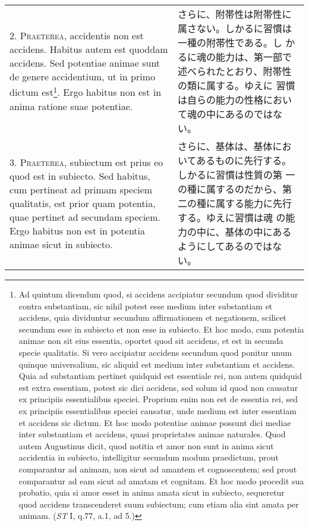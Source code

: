\documentclass[10pt]{jsarticle} %
\begin{document}
\begin{longtable}{p{21em}p{21em}}
2. {\scshape Praeterea}, accidentis non est accidens. Habitus autem
est quoddam accidens. Sed potentiae animae sunt de genere accidentium,
ut in primo dictum est\footnote{Ad quintum dicendum quod, si accidens
accipiatur secundum quod dividitur contra substantiam, sic nihil
potest esse medium inter substantiam et accidens, quia dividuntur
secundum affirmationem et negationem, scilicet secundum esse in
subiecto et non esse in subiecto. Et hoc modo, cum potentia animae non
sit eius essentia, oportet quod sit accidens, et est in secunda specie
qualitatis. Si vero accipiatur accidens secundum quod ponitur unum
quinque universalium, sic aliquid est medium inter substantiam et
accidens. Quia ad substantiam pertinet quidquid est essentiale rei,
non autem quidquid est extra essentiam, potest sic dici accidens, sed
solum id quod non causatur ex principiis essentialibus
speciei. Proprium enim non est de essentia rei, sed ex principiis
essentialibus speciei causatur, unde medium est inter essentiam et
accidens sic dictum. Et hoc modo potentiae animae possunt dici mediae
inter substantiam et accidens, quasi proprietates animae
naturales. Quod autem Augustinus dicit, quod notitia et amor non sunt
in anima sicut accidentia in subiecto, intelligitur secundum modum
praedictum, prout comparantur ad animam, non sicut ad amantem et
cognoscentem; sed prout comparantur ad eam sicut ad amatam et
cognitam. Et hoc modo procedit sua probatio, quia si amor esset in
anima amata sicut in subiecto, sequeretur quod accidens transcenderet
suum subiectum; cum etiam alia sint amata per animam. ({\itshape ST} I, q.77, a.1, ad 5.)}. Ergo habitus
non est in anima ratione suae potentiae.

&

さらに、附帯性は附帯性に属さない。しかるに習慣は一種の附帯性である。し
かるに魂の能力は、第一部で述べられたとおり、附帯性の類に属する。ゆえに
習慣は自らの能力の性格において魂の中にあるのではない。

\\



3. {\scshape Praeterea}, subiectum est prius eo quod est in subiecto. Sed habitus,
cum pertineat ad primam speciem qualitatis, est prior quam potentia,
quae pertinet ad secundam speciem. Ergo habitus non est in potentia
animae sicut in subiecto.

&

さらに、基体は、基体においてあるものに先行する。しかるに習慣は性質の第
一の種に属するのだから、第二の種に属する能力に先行する。ゆえに習慣は魂
の能力の中に、基体の中にあるようにしてあるのではない。


\end{longtable}
\end{document}
